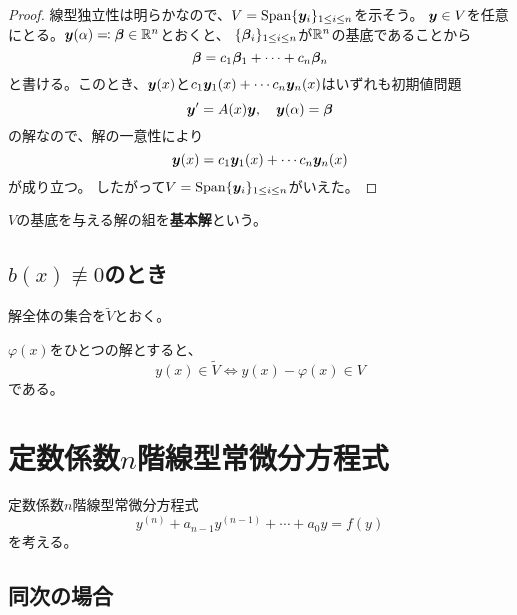 \documentclass[report]{jlreq}
\begin{document}
\begin{proof}
    線型独立性は明らかなので、$V = \operatorname{Span} \{ \bm{y}_i \}_{1 \le i \le n}$を示そう。
    $\bm{y} \in V$を任意にとる。$\bm{y}(\alpha) \eqqcolon \bm{\beta} \in \mathbb{R}^n$とおくと、
    $\{ \bm{\beta}_i \}_{1 \le i \le n}$が$\mathbb{R}^n$の基底であることから
    \begin{equation}
        \bm{\beta} = c_1 \bm{\beta}_1 + \cdots + c_n \bm{\beta}_n
    \end{equation}
    と書ける。このとき、$\bm{y}(x)$と$c_1 \bm{y}_1(x) + \cdots c_n \bm{y}_n(x)$はいずれも初期値問題
    \begin{equation}
        \bm{y}' = A(x) \bm{y},\quad \bm{y}(\alpha) = \bm{\beta}
    \end{equation}
    の解なので、解の一意性により
    \begin{equation}
        \bm{y}(x) = c_1 \bm{y}_1(x) + \cdots c_n \bm{y}_n(x)
    \end{equation}
    が成り立つ。
    したがって$V = \operatorname{Span} \{ \bm{y}_i \}_{1 \le i \le n}$がいえた。
\end{proof}

\begin{definition}[3.1.3]
    $V$の基底を与える解の組を\textbf{基本解}という。
\end{definition}


\subsection{$b(x) \not\equiv 0$のとき}
解全体の集合を$\tilde{V}$とおく。

\begin{theorem}[3.1.4]
    $\varphi(x)$をひとつの解とすると、
    \begin{equation}
        y(x) \in \tilde{V} \iff y(x) - \varphi(x) \in V
    \end{equation}
    である。
\end{theorem}






\section{定数係数$n$階線型常微分方程式}

定数係数$n$階線型常微分方程式
\begin{equation}
    y^{(n)} + a_{n-1} y^{(n-1)} + \cdots + a_0 y = f(y) \tag{(1)}
\end{equation}
を考える。

\subsection{同次の場合}
\end{document}
